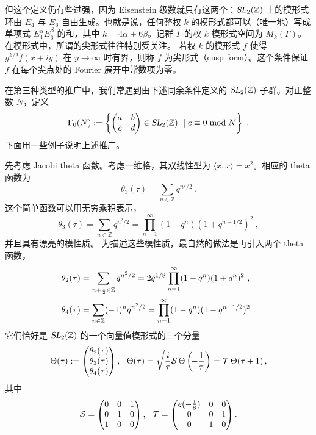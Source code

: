 \documentclass[11pt,a4paper,fontset=windows]{ctexart}
\numberwithin{equation}{section}
\newcommand{\SL}{\operatorname{\textsl{SL}}}      %
\newcommand{\ZZ}{\mathbb{Z}}
\newcommand{\Z}{\mathbb{Z}}
\newcommand{\xmod}{{\rm \;mod\;}}
\def\a{\alpha}
\def\b{\beta}
\def\t{\tau}
\newcommand{\be}{\begin{equation}}
\newcommand{\ee}{\end{equation}}
\newcommand{\bem}{\begin{pmatrix}}
\newcommand{\eem}{\end{pmatrix}}
\begin{document}

但这个定义仍有些过强，因为 Eisenstein 级数就只有这两个：$\SL_2(\Z)$ 上的模形式环由 $E_4$ 与 $E_6$ 自由生成。也就是说，任何整权 $k$ 的模形式都可以（唯一地）写成单项式 $E_4^\a E_6^\b$ 的和，其中 $k=4\a+6\b$。记群 $\Gamma$ 的权 $k$ 模形式空间为 $M_k(\Gamma)$。在模形式中，所谓的尖形式往往特别受关注。
若权 $k$ 的模形式 $f$ 使得 $y^{k/2} f(x+i y)$ 在 $y\to \infty$ 时有界，则称 $f$ 为尖形式（cusp form）。这个条件保证 $f$ 在每个尖点处的 Fourier 展开中常数项为零。


在第三种类型的推广中，我们常遇到由下述同余条件定义的 $\SL_2(\ZZ)$ 子群。对正整数 $N$，定义
\be\label{def:cong_subgr}
\Gamma_0(N) := \left\{ \bem a& b \\ c&d \eem \in \SL_2(\ZZ) ~\mid c\equiv 0 \xmod{N}  \right\}~. 
\ee
下面用一些例子说明上述推广。


先考虑 Jacobi theta 函数。考虑一维格，其双线性型为 $\langle x,x \rangle =x^2$。相应的 theta 函数为
\be
\theta_3(\tau)  = \sum_{n\in \Z} q^{n^2/2} \, . 
\ee
这个简单函数可以用无穷乘积表示，
\be
\theta_3(\tau)  = \sum_{n\in \Z} q^{n^2/2} = \prod_{n=1}^\infty (1-q^n)(1+q^{n-1/2})^2~, 
\ee
并且具有漂亮的模性质。
为描述这些模性质，最自然的做法是再引入两个 theta 函数，
\begin{equation}
\begin{split}
\theta_2(\tau) & = \sum_{n+{1\over 2}\in \Z} q^{n^2/2} =2q^{1/8} \prod_{n=1}^\infty (1-q^n)(1+q^{n})^2~, \\
\theta_4(\tau) & = \sum_{n\in \Z} (-1)^n q^{n^2/2} = \prod_{n=1}^\infty (1-q^n)(1-q^{n-1/2})^2~.
\end{split}
\end{equation}
它们恰好是 $\SL_2(\Z)$ 的一个向量值模形式的三个分量
\be\label{eqn:transf_theta}
\Theta(\t) := \bem  \theta_2(\tau) \\ \theta_3(\tau) \\ \theta_4(\tau)  \eem,~~   \Theta(\t) = \sqrt{i\over \t} {\cal S}\,   \Theta\left(\!-\frac{1}{\t}\right)  = {\cal T} \,\Theta(\t+1)\, ,
\ee
其中
\be
{\cal S} = \bem  0&0&1\\ 0&1&0 \\ 1&0&0 \eem , ~~{\cal T} = \bem  e(-\tfrac{1}{8})&0&0\\ 0&0&1 \\ 0&1&0 \eem  . 
\ee
\end{document}
